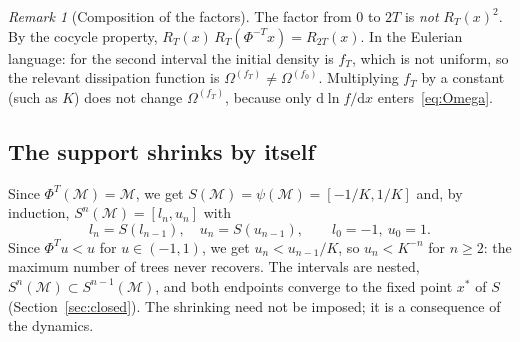 \documentclass[11pt,a4paper]{article}
\theoremstyle{remark}
\newtheorem{remark}{Remark}
\newcommand{\M}{\mathcal{M}}
\newcommand{\dd}{\mathrm{d}}
\begin{document}
\begin{remark}[Composition of the factors]
The factor from $0$ to $2T$ is \emph{not} $R_T(x)^2$. By the cocycle property,
$R_T(x)\,R_T(\Phi^{-T}x)=R_{2T}(x)$. In the Eulerian language: for the second
interval the initial density is $f_T$, which is not uniform, so the relevant
dissipation function is $\Omega^{(f_T)}\neq\Omega^{(f_0)}$. Multiplying $f_T$
by a constant (such as $K$) does not change $\Omega^{(f_T)}$, because only
$\dd\ln f/\dd x$ enters~\eqref{eq:Omega}.
\end{remark}

\subsection{The support shrinks by itself}
Since $\Phi^T(\M)=\M$, we get $S(\M)=\psi(\M)=[-1/K,1/K]$ and, by
induction, $S^n(\M)=[l_n,u_n]$ with
\begin{equation}
  l_n = S(l_{n-1}),\quad u_n=S(u_{n-1}),\qquad l_0=-1,\ u_0=1 .
\end{equation}
Since $\Phi^T u<u$ for $u\in(-1,1)$, we get $u_n<u_{n-1}/K$, so $u_n<K^{-n}$
for $n\ge2$: the maximum number of trees never recovers. The intervals are
nested, $S^{n}(\M)\subset S^{n-1}(\M)$, and both endpoints converge to the
fixed point $x^*$ of $S$ (Section~\ref{sec:closed}). The shrinking need not be
imposed; it is a consequence of the dynamics.
\end{document}
